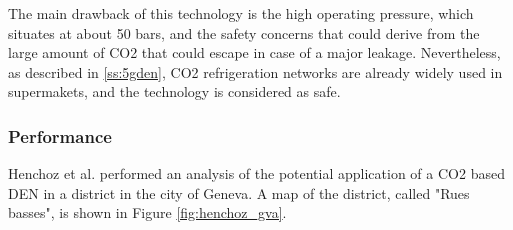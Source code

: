 \documentclass{article}
\begin{document}
The main drawback of this technology is the high operating pressure, which situates at about 50 bars, and the safety concerns that could derive from the large amount of CO2 that could escape in case of a major leakage. Nevertheless, as described in \ref{ss:5gden}, CO2 refrigeration networks are already widely used in supermakets, and the technology is considered as safe. \\

\subsubsection{Performance}
Henchoz et al.\cite{henchozPotentialRefrigerantBased} performed an analysis of the potential application of a CO2 based DEN in a district in the city of Geneva. A map of the district, called "Rues basses", is shown in Figure \ref{fig:henchoz_gva}.
\end{document}
